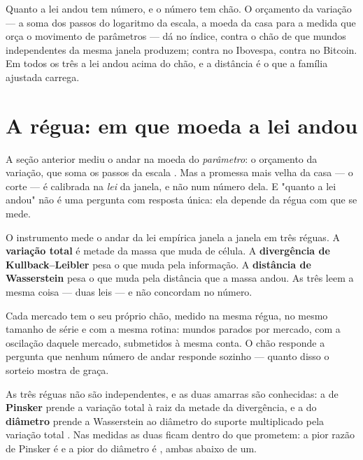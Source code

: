 Quanto a lei andou tem número, e o número tem chão. O orçamento da variação --- a soma dos passos
do logaritmo da escala, a moeda da casa para a medida que orça o movimento de parâmetros
\cite{chen2018stationary} --- dá \numJanelaSpOrcamento{} no índice, contra o chão de
\numJanelaSpOrcamentoChao{} que mundos independentes da mesma janela produzem; \numJanelaIbovOrcamento{}
contra \numJanelaIbovOrcamentoChao{} no Ibovespa, \numJanelaBtcOrcamento{} contra
\numJanelaBtcOrcamentoChao{} no Bitcoin. Em todos os três a lei andou acima do chão, e a distância
é o que a família ajustada carrega.

\section{A régua: em que moeda a lei andou}

A seção anterior mediu o andar na moeda do \emph{parâmetro}: o orçamento da variação, que soma os
passos da escala \cite{chen2018stationary}. Mas a promessa mais velha da casa --- o corte --- é
calibrada na \emph{lei} da janela, e não num número dela. E "quanto a lei andou" não é uma pergunta
com resposta única: ela depende da régua com que se mede.

O instrumento mede o andar da lei empírica janela a janela em três réguas. A \textbf{variação
total} é metade da massa que muda de célula. A \textbf{divergência de Kullback--Leibler} pesa o que
muda pela informação. A \textbf{distância de Wasserstein} pesa o que muda pela distância que a
massa andou. As três leem a mesma coisa --- duas leis --- e não concordam no número.

Cada mercado tem o seu próprio chão, medido na mesma régua, no mesmo tamanho de série e com a mesma
rotina: \numReguaChaoMundos{} mundos parados por mercado, com a oscilação daquele mercado,
submetidos à mesma conta. O chão responde a pergunta que nenhum número de andar responde sozinho
--- quanto disso o sorteio mostra de graça.

As três réguas não são independentes, e as duas amarras são conhecidas: a de \textbf{Pinsker}
prende a variação total à raiz da metade da divergência, e a do \textbf{diâmetro} prende a
Wasserstein ao diâmetro do suporte multiplicado pela variação total \cite{gibbs2002choosing}. Nas
medidas as duas ficam dentro do que prometem: a pior razão de Pinsker é \numReguaPinskerPior{} e a
pior do diâmetro é \numReguaDiametroPior, ambas abaixo de um.

